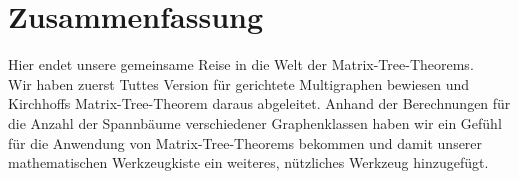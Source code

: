 \section*{Zusammenfassung}
Hier endet unsere gemeinsame Reise in die Welt der Matrix-Tree-Theorems.\\
Wir haben zuerst Tuttes Version für gerichtete Multigraphen bewiesen und Kirchhoffs Matrix-Tree-Theorem daraus abgeleitet. Anhand der Berechnungen für die Anzahl der Spannbäume verschiedener Graphenklassen haben wir ein Gefühl für die Anwendung von Matrix-Tree-Theorems bekommen und damit unserer mathematischen Werkzeugkiste ein weiteres, nützliches Werkzeug hinzugefügt.
